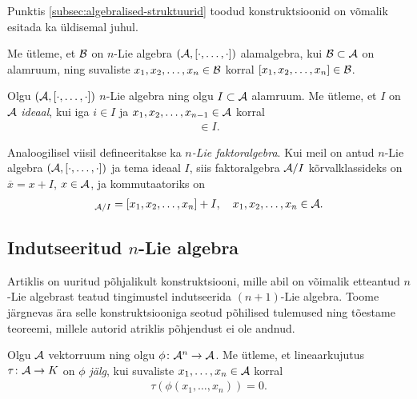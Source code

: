 Punktis \ref{subsec:algebralised-struktuurid} toodud konstruktsioonid
on võmalik esitada ka üldisemal juhul.

\begin{dfn}
    Me ütleme, et $\mathcal{B}$ on $n$-Lie algebra $(\mathcal{A}, [\cdot, \dots, \cdot])$
    alamalgebra, kui $\mathcal{B} \subset \mathcal{A}$ on alamruum, ning suvaliste
    $x_1, x_2, \dots, x_n \in \mathcal{B}$ korral $[x_1, x_2, \dots, x_n] \in \mathcal{B}$.
\end{dfn}

\begin{dfn}
    Olgu $(\mathcal{A}, [\cdot, \dots, \cdot])$ $n$-Lie algebra ning olgu
    $I \subset \mathcal{A}$ alamruum. Me ütleme, et $I$ on $\mathcal{A}$ \emph{ideaal}, kui
    iga $i \in I$ ja $x_1, x_2, \dots, x_{n-1} \in \mathcal{A}$ korral
    \begin{align*}
        [i, x_1, x_2, \dots, x_{n-1}] \in I.
    \end{align*}
\end{dfn}

Analoogilisel viisil defineeritakse ka \emph{$n$-Lie faktoralgebra}.
Kui meil on antud $n$-Lie algebra $(\mathcal{A}, [\cdot, \dots, \cdot])$ ja tema
ideaal $I$, siis faktoralgebra $\mathcal{A}/I$ kõrvalklassideks on
$\overline{x} = x + I$, $x \in \mathcal{A}$, ja kommutaatoriks on
\begin{align*}
    [x_1 + I, x_2 + I, \dots, x_n + I]_{\A/I} = [x_1, x_2, \dots, x_n] + I,\quad
    x_1, x_2, \dots, x_n \in \A.
\end{align*}

\subsection{Indutseeritud \texorpdfstring{$n$}\ -Lie algebra}

Artiklis \cite{AKMS:2014} on uuritud põhjalikult konstruktsiooni, mille
abil on võimalik etteantud $n$-Lie algebrast teatud tingimustel indutseerida
$(n+1)$-Lie algebra. Toome järgnevas ära selle konstruktsiooniga seotud
põhilised tulemused ning tõestame teoreemi, millele autorid atriklis põhjendust
ei ole andnud.

\begin{dfn}[Jälg]
    Olgu $\mathcal{A}$ vektorruum ning olgu $\phi \colon \mathcal{A}^n \to \mathcal{A}$. Me
    ütleme, et lineaarkujutus $\tau \colon \mathcal{A} \to K$ on
    \emph{$\phi$ jälg}, kui suvaliste $x_1, \dots, x_n \in \mathcal{A}$
    korral
    \begin{align*}
        \tau \left(
            \phi \left( x_1, \dots, x_n \right)
        \right) = 0.
    \end{align*}
\end{dfn}

